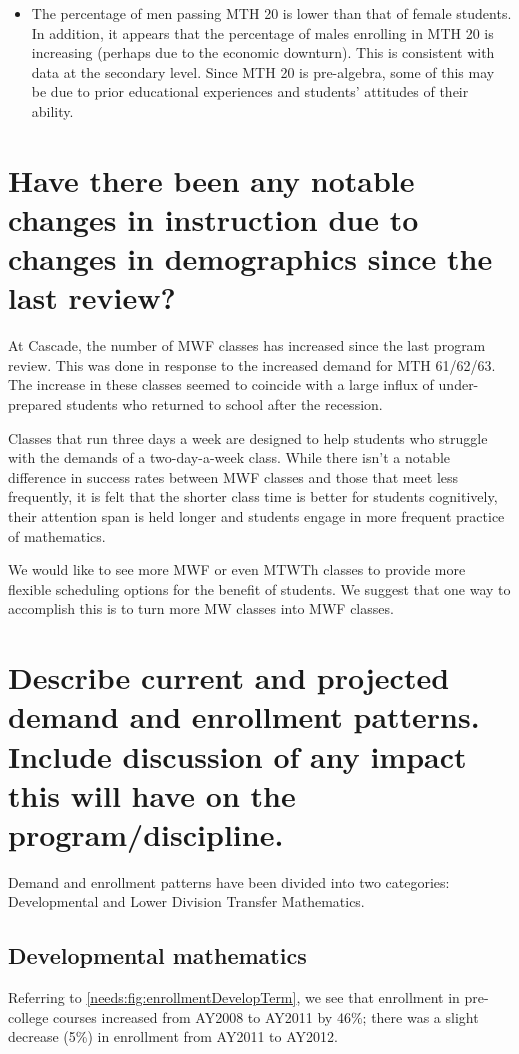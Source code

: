 \begin{itemize}
	\item The percentage of men passing MTH 20 is lower than that of female students.
	      In addition, it appears that the percentage of males enrolling in MTH 20 is increasing (perhaps due to the economic downturn).
	      This is consistent with data at the secondary level.
	      Since MTH 20 is pre-algebra, some of this may be due to prior educational experiences and students' attitudes of their ability.
\end{itemize}

\section[Changes in instruction due to changes in demographics]{Have there been
  any notable changes in instruction due to changes in
  demographics since the last review?}
At Cascade, the number of MWF classes has increased since the last program review.
This was done in response to the increased demand for MTH 61/62/63.
The increase in these classes seemed to coincide with a large influx of under-prepared students who returned to school after the recession.

Classes that run three days a week are designed to help students who struggle with the demands of a two-day-a-week class.
While there isn't a notable difference in success rates between MWF classes and those that meet less frequently, it is felt that the shorter class time is better for students cognitively, their attention span is held longer and students engage in more frequent practice of mathematics.

We would like to see more MWF or even MTWTh classes to provide more flexible scheduling options for the benefit of students.
We suggest that one way to accomplish this is to turn more MW classes into MWF classes.

\section[Demand and enrollment patterns]{Describe current and projected demand
  and enrollment patterns.
  Include discussion of any impact this will have on the program/discipline.
 }
Demand and enrollment patterns have been divided into two categories: Developmental and Lower Division Transfer Mathematics.

\subsection{Developmental mathematics}
Referring to \cref{needs:fig:enrollmentDevelopTerm}, we see that enrollment in pre-college courses increased from AY2008 to AY2011 by 46\%; there was a slight decrease (5\%) in enrollment from AY2011 to AY2012.

